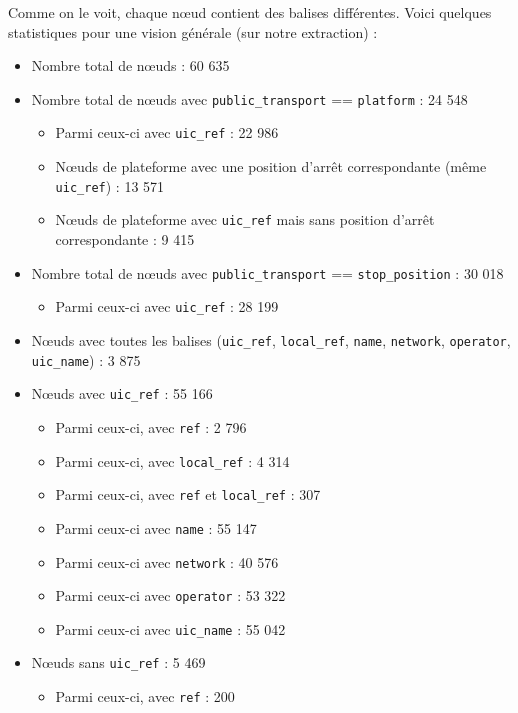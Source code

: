 Comme on le voit, chaque nœud contient des balises différentes. Voici quelques statistiques pour une vision générale (sur notre extraction) :
\begin{itemize}
    \item Nombre total de nœuds : 60 635
    \item Nombre total de nœuds avec \texttt{public\_transport} == \texttt{platform} : 24 548
    \begin{itemize}
        \item Parmi ceux-ci avec \texttt{uic\_ref} : 22 986
        \item Nœuds de plateforme avec une position d'arrêt correspondante (même \texttt{uic\_ref}) : 13 571
        \item Nœuds de plateforme avec \texttt{uic\_ref} mais sans position d'arrêt correspondante : 9 415
    \end{itemize}
    \item Nombre total de nœuds avec \texttt{public\_transport} == \texttt{stop\_position} : 30 018
    \begin{itemize}
        \item Parmi ceux-ci avec \texttt{uic\_ref} : 28 199
    \end{itemize}
    \item Nœuds avec toutes les balises (\texttt{uic\_ref}, \texttt{local\_ref}, \texttt{name}, \texttt{network}, \texttt{operator}, \texttt{uic\_name}) : 3 875
    \item Nœuds avec \texttt{uic\_ref} : 55 166
    \begin{itemize}
        \item Parmi ceux-ci, avec \texttt{ref} : 2 796
        \item Parmi ceux-ci, avec \texttt{local\_ref} : 4 314
        \item Parmi ceux-ci, avec \texttt{ref} et \texttt{local\_ref} : 307
        \item Parmi ceux-ci avec \texttt{name} : 55 147
        \item Parmi ceux-ci avec \texttt{network} : 40 576
        \item Parmi ceux-ci avec \texttt{operator} : 53 322
        \item Parmi ceux-ci avec \texttt{uic\_name} : 55 042
    \end{itemize}
    \item Nœuds sans \texttt{uic\_ref} : 5 469
    \begin{itemize}
        \item Parmi ceux-ci, avec \texttt{ref} : 200

\end{itemize}
\end{itemize}
